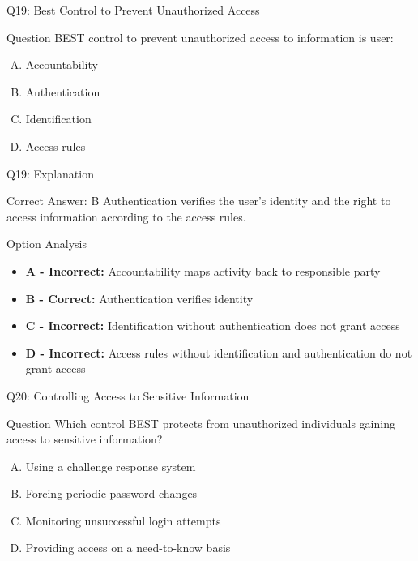 \documentclass{beamer}
\begin{document}
	\begin{frame}{Q19: Best Control to Prevent Unauthorized Access}
		\begin{block}{Question}
			BEST control to prevent unauthorized access to information is user:
		\end{block}
		\begin{enumerate}[(A)]
			\item Accountability
			\item Authentication
			\item Identification
			\item Access rules
		\end{enumerate}
	\end{frame}
	
	\begin{frame}{Q19: Explanation}
		\begin{block}{Correct Answer: B}
			Authentication verifies the user's identity and the right to access information according to the access rules.
		\end{block}
		\begin{block}{Option Analysis}
			\begin{itemize}
				\item \textbf{A - Incorrect:} Accountability maps activity back to responsible party
				\item \textbf{B - Correct:} Authentication verifies identity
				\item \textbf{C - Incorrect:} Identification without authentication does not grant access
				\item \textbf{D - Incorrect:} Access rules without identification and authentication do not grant access
			\end{itemize}
		\end{block}
	\end{frame}
	
	\begin{frame}{Q20: Controlling Access to Sensitive Information}
		\begin{block}{Question}
			Which control BEST protects from unauthorized individuals gaining access to sensitive information?
		\end{block}
		\begin{enumerate}[(A)]
			\item Using a challenge response system
			\item Forcing periodic password changes
			\item Monitoring unsuccessful login attempts
			\item Providing access on a need-to-know basis
		\end{enumerate}
	\end{frame}
	
\end{document}
